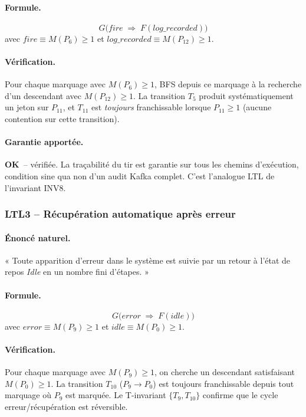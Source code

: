 \documentclass[11pt,a4paper]{article}
\newcommand{\OK}{\textcolor{green!50!black}{\textbf{OK}}}
\begin{document}
\paragraph{Formule.}
\[
G\bigl(\textit{fire} \;\Longrightarrow\; F(\textit{log\_recorded})\bigr)
\]
avec $\textit{fire} \equiv M(P_6) \geq 1$ et
$\textit{log\_recorded} \equiv M(P_{12}) \geq 1$.

\paragraph{Vérification.}
Pour chaque marquage avec $M(P_6) \geq 1$, BFS depuis ce marquage à la
recherche d'un descendant avec $M(P_{12}) \geq 1$. La transition $T_5$
produit systématiquement un jeton sur $P_{11}$, et $T_{11}$ est
\emph{toujours} franchissable lorsque $P_{11} \geq 1$ (aucune contention
sur cette transition).

\paragraph{Garantie apportée.}
\OK\ -- vérifiée. La traçabilité du tir est garantie sur tous les chemins
d'exécution, condition sine qua non d'un audit Kafka complet. C'est l'analogue
LTL de l'invariant INV8.

\subsubsection*{LTL3 -- Récupération automatique après erreur}

\paragraph{Énoncé naturel.}
« Toute apparition d'erreur dans le système est suivie par un retour à
l'état de repos \textit{Idle} en un nombre fini d'étapes. »

\paragraph{Formule.}
\[
G\bigl(\textit{error} \;\Longrightarrow\; F(\textit{idle})\bigr)
\]
avec $\textit{error} \equiv M(P_9) \geq 1$ et
$\textit{idle} \equiv M(P_0) \geq 1$.

\paragraph{Vérification.}
Pour chaque marquage avec $M(P_9) \geq 1$, on cherche un descendant
satisfaisant $M(P_0) \geq 1$. La transition $T_{10}$ ($P_9 \to P_0$) est
toujours franchissable depuis tout marquage où $P_9$ est marquée. Le
T-invariant $\{T_9, T_{10}\}$ confirme que le cycle erreur/récupération est
réversible.
\end{document}
